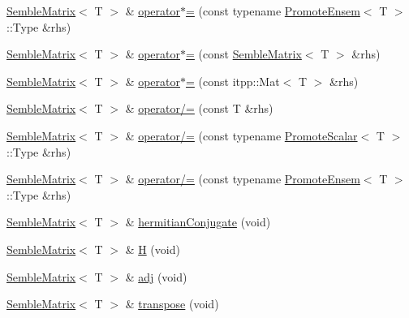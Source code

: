 \begin{DoxyCompactItemize}
\item 
\mbox{\hyperlink{structSEMBLE_1_1SembleMatrix}{Semble\+Matrix}}$<$ T $>$ \& \mbox{\hyperlink{structSEMBLE_1_1SembleMatrix_a0170ab204b392638e23a215fe9943cd5}{operator$\ast$=}} (const typename \mbox{\hyperlink{structSEMBLE_1_1PromoteEnsem}{Promote\+Ensem}}$<$ T $>$\+::Type \&rhs)
\item 
\mbox{\hyperlink{structSEMBLE_1_1SembleMatrix}{Semble\+Matrix}}$<$ T $>$ \& \mbox{\hyperlink{structSEMBLE_1_1SembleMatrix_aa96c5b6adbf7c2a69d602d68d7abc863}{operator$\ast$=}} (const \mbox{\hyperlink{structSEMBLE_1_1SembleMatrix}{Semble\+Matrix}}$<$ T $>$ \&rhs)
\item 
\mbox{\hyperlink{structSEMBLE_1_1SembleMatrix}{Semble\+Matrix}}$<$ T $>$ \& \mbox{\hyperlink{structSEMBLE_1_1SembleMatrix_a602798716caad1042d39dc1c9dfd2730}{operator$\ast$=}} (const itpp\+::\+Mat$<$ T $>$ \&rhs)
\item 
\mbox{\hyperlink{structSEMBLE_1_1SembleMatrix}{Semble\+Matrix}}$<$ T $>$ \& \mbox{\hyperlink{structSEMBLE_1_1SembleMatrix_a372ea71e90cececd03d22b6ac2076ff5}{operator/=}} (const T \&rhs)
\item 
\mbox{\hyperlink{structSEMBLE_1_1SembleMatrix}{Semble\+Matrix}}$<$ T $>$ \& \mbox{\hyperlink{structSEMBLE_1_1SembleMatrix_ab57fe2184f8f547f2cf6cdf71143f67f}{operator/=}} (const typename \mbox{\hyperlink{structSEMBLE_1_1PromoteScalar}{Promote\+Scalar}}$<$ T $>$\+::Type \&rhs)
\item 
\mbox{\hyperlink{structSEMBLE_1_1SembleMatrix}{Semble\+Matrix}}$<$ T $>$ \& \mbox{\hyperlink{structSEMBLE_1_1SembleMatrix_a3af162e4847faabe6206811309d9ed8e}{operator/=}} (const typename \mbox{\hyperlink{structSEMBLE_1_1PromoteEnsem}{Promote\+Ensem}}$<$ T $>$\+::Type \&rhs)
\item 
\mbox{\hyperlink{structSEMBLE_1_1SembleMatrix}{Semble\+Matrix}}$<$ T $>$ \& \mbox{\hyperlink{structSEMBLE_1_1SembleMatrix_a2d9ca142e670502eb4f05c559dc33f1d}{hermitian\+Conjugate}} (void)
\item 
\mbox{\hyperlink{structSEMBLE_1_1SembleMatrix}{Semble\+Matrix}}$<$ T $>$ \& \mbox{\hyperlink{structSEMBLE_1_1SembleMatrix_a560e987e3d3151b9d5c31b4bb919983a}{H}} (void)
\item 
\mbox{\hyperlink{structSEMBLE_1_1SembleMatrix}{Semble\+Matrix}}$<$ T $>$ \& \mbox{\hyperlink{structSEMBLE_1_1SembleMatrix_a1005b8d94ad7731fe6826fd614203703}{adj}} (void)
\item 
\mbox{\hyperlink{structSEMBLE_1_1SembleMatrix}{Semble\+Matrix}}$<$ T $>$ \& \mbox{\hyperlink{structSEMBLE_1_1SembleMatrix_a2013e3dd6f0dbfc71933b7e2c0a6e716}{transpose}} (void)

\end{DoxyCompactItemize}
